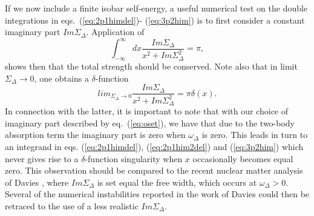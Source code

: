 If we now include a finite isobar self-energy,
a useful numerical test on the double integrations in eqs.\ (\ref{eq:2p1himdel})-
(\ref{eq:3p2him}) is to first consider a constant imaginary part
$Im\Sigma_{\Delta}$. Application of
\[
\int_{-\infty}^{\infty}dx\frac{Im\Sigma_{\Delta}}{x^2
+Im\Sigma_{\Delta}^2} =\pi,
\label{eq:const}
\]
shows then that the total strength should be conserved. Note also
that in limit $\Sigma_{\Delta}\rightarrow 0$, one obtains a
$\delta$-function
\[
{\displaystyle lim_{\Sigma_{\Delta}\rightarrow 0}\frac{Im\Sigma_{\Delta}}{x^2
+Im\Sigma_{\Delta}^2}=\pi \delta (x)}.
\]
In connection with the latter, it is important to note
that with our choice of imaginary part described by eq.\
(\ref{eq:oset}), we have that  due to the two-body absorption term
the imaginary part is zero when $\omega_{\Delta}$ is zero. This leads in turn
to an integrand in eqs. (\ref{eq:2p1himdel}), (\ref{eq:2p1him2del}) 
and (\ref{eq:3p2him}) which never gives
rise to a $\delta$-function singularity when $x$ occasionally becomes
equal zero. This observation should be compared to the
recent nuclear matter analysis of Davies \cite{dav92}, where 
$Im\Sigma_{\Delta}$ is set equal the free width, which occurs at 
$\omega_{\Delta}>0$. Several of the numerical instabilities reported in the work of
Davies \cite{dav92} could  then be retraced to the use of a less realistic
$Im\Sigma_{\Delta}$. 

